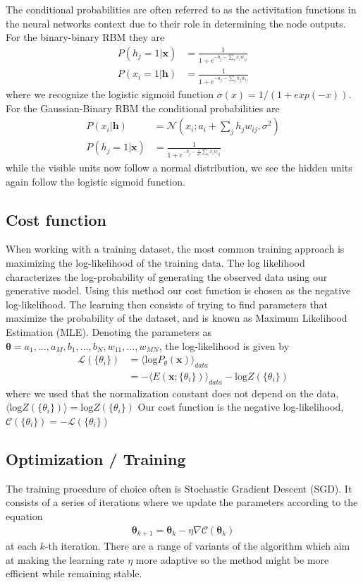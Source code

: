 \documentclass[norsk,a4paper,11pt]{article}
\begin{document}
The conditional probabilities are often referred to as the activitation functions in the neural networks context due to their role in determining the node outputs. For the binary-binary RBM they are
\begin{align}
	P(h_j = 1 | \bm{x}) &= \frac{1}{1 + e^{-b_j - \sum_i x_i w_{ij}}} \\
	P(x_i = 1 | \bm{h}) &= \frac{1}{1 + e^{-a_j - \sum_j h_j w_{ij}}}
\end{align}
where we recognize the logistic sigmoid function $\sigma (x) = 1/(1+exp(-x))$.
For the Gaussian-Binary RBM the conditional probabilities are
\begin{align}
	P(x_i|\mathbf{h}) &= \mathcal{N}(x_i; a_i+ \sum_j h_j w_{ij}, \sigma^2) \\
	P(h_j=1|\mathbf{x}) &=  \frac{1}{1+e^{-b_j-\frac{1}{\sigma^2} \sum_i x_i w_{ij}}}
\end{align}
while the visible units now follow a normal distribution, we see the hidden units again follow the logistic sigmoid function.

\subsection{Cost function}
When working with a training dataset, the most common training approach is maximizing the log-likelihood of the training data. The log likelihood characterizes the log-probability of generating the observed data using our generative model. Using this method our cost function is chosen as the negative log-likelihood. The learning then consists of trying to find parameters that maximize the probability of the dataset, and is known as Maximum Likelihood Estimation (MLE).
Denoting the parameters as $\bm{\theta} = a_1,...,a_M,b_1,...,b_N,w_{11},...,w_{MN}$, the log-likelihood is given by
\begin{align}
	\mathcal{L}(\{ \theta_i \}) &= \langle \text{log} P_\theta(\bm{x}) \rangle_{data} \\
	&= - \langle E(\bm{x}; \{ \theta_i\}) \rangle_{data} - \text{log} Z(\{ \theta_i\})
\end{align}
where we used that the normalization constant does not depend on the data, $\langle \text{log} Z(\{ \theta_i\}) \rangle = \text{log} Z(\{ \theta_i\})$
Our cost function is the negative log-likelihood, $\mathcal{C}(\{ \theta_i \}) = - \mathcal{L}(\{ \theta_i \})$

\subsection{Optimization / Training}
The training procedure of choice often is Stochastic Gradient Descent (SGD). It consists of a series of iterations where we update the parameters according to the equation
\begin{align}
	\bm{\theta}_{k+1} = \bm{\theta}_k - \eta \nabla \mathcal{C} (\bm{\theta}_k)
\end{align}
at each $k$-th iteration. There are a range of variants of the algorithm which aim at making the learning rate $\eta$ more adaptive so the method might be more efficient while remaining stable.
\end{document}
